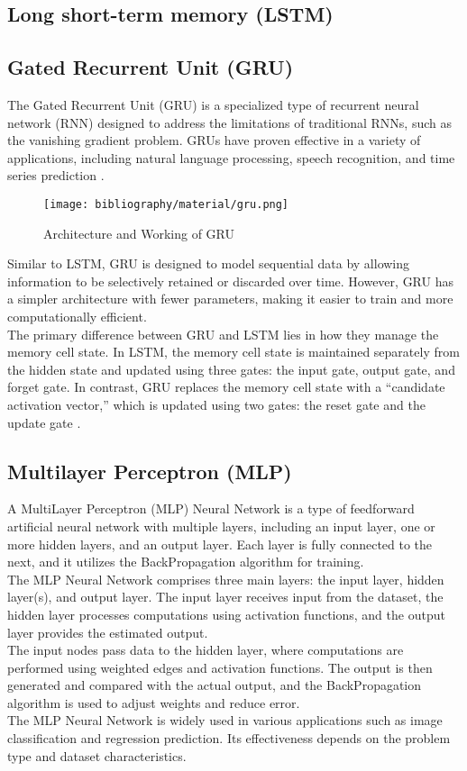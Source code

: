 \documentclass{ieeeojies}
\begin{document}
	\subsection{Long short-term memory (LSTM)}
	
	
	\subsection{Gated Recurrent Unit (GRU)}
	The Gated Recurrent Unit (GRU) is a specialized type of recurrent neural network (RNN) designed to address the limitations of traditional RNNs, such as the vanishing gradient problem. GRUs have proven effective in a variety of applications, including natural language processing, speech recognition, and time series prediction \cite{b15}.
	\begin{figure}[H] %
		\centering
		\texttt{[image: bibliography/material/gru.png]}
		\caption{Architecture and Working of GRU}
	\end{figure}
	\noindent Similar to LSTM, GRU is designed to model sequential data by allowing information to be selectively retained or discarded over time. However, GRU has a simpler architecture with fewer parameters, making it easier to train and more computationally efficient.\\
	The primary difference between GRU and LSTM lies in how they manage the memory cell state. In LSTM, the memory cell state is maintained separately from the hidden state and updated using three gates: the input gate, output gate, and forget gate. In contrast, GRU replaces the memory cell state with a “candidate activation vector,” which is updated using two gates: the reset gate and the update gate \cite{b16}.
	
	\subsection{Multilayer Perceptron (MLP)}
	
	A MultiLayer Perceptron (MLP) Neural Network is a type of feedforward artificial neural network with multiple layers, including an input layer, one or more hidden layers, and an output layer. Each layer is fully connected to the next, and it utilizes the BackPropagation algorithm for training. \\
	The MLP Neural Network comprises three main layers: the input layer, hidden layer(s), and output layer. The input layer receives input from the dataset, the hidden layer processes computations using activation functions, and the output layer provides the estimated output. \\
	The input nodes pass data to the hidden layer, where computations are performed using weighted edges and activation functions. The output is then generated and compared with the actual output, and the BackPropagation algorithm is used to adjust weights and reduce error. \\
	The MLP Neural Network is widely used in various applications such as image classification and regression prediction. Its effectiveness depends on the problem type and dataset characteristics. \cite{b17} \\
	
\end{document}
